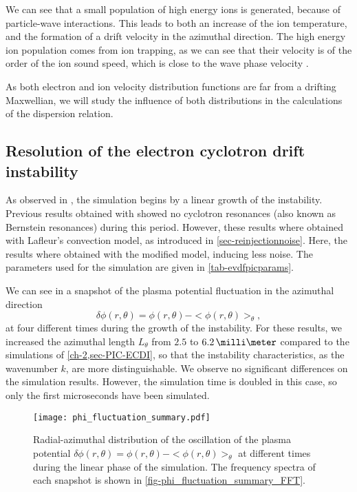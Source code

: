   We can see that a small population of high energy ions is generated, because of particle-wave interactions.
  This leads to both an increase of the ion temperature, and the formation of a drift velocity in the azimuthal direction.
  The high energy ion population comes from ion trapping, as we can see that their velocity is of the order of the ion sound speed, which is close to the wave phase velocity \citep{lafleur2018}.
  
  As both electron and ion velocity distribution functions are far from a drifting Maxwellian, we will study the influence of both distributions in the calculations of the dispersion relation.
  
  
  \subsection{Resolution of the electron cyclotron drift instability} \label{subsec-ECDIPIC}
  
  
    As observed in , the simulation begins by a linear growth of the instability.
    Previous results obtained with \LPPic \citep{croes2017a} showed no cyclotron resonances (also known as Bernstein resonances) during this period.
    However, these results where obtained with Lafleur's convection model, as introduced in \cref{sec-reinjectionnoise}.
    Here, the results where obtained with the modified model, inducing less noise.
    The parameters used for the simulation are given in \cref{tab-evdfpicparams}.
    
    We can see in   a snapshot of the plasma potential fluctuation in the azimuthal direction \[ \delta \phi(r, \theta) = \phi(r, \theta) - < \phi(r, \theta) >_{ \theta}, \]
    at four different times during the growth of the instability.
    For these results, we increased the azimuthal length $L_{\theta}$ from $2.5$ to $6.2\,\milli\meter$ compared to the simulations of \cref{ch-2,sec-PIC-ECDI}, so that the instability characteristics, as the wavenumber $k$, are more distinguishable.
    We observe no significant differences on the simulation results.
    However, the simulation time is doubled in this case, so only the first microseconds have been simulated.
    

    
    \begin{figure}[!hbt]
      \centering
      \texttt{[image: phi\_fluctuation\_summary.pdf]}
      \caption{Radial-azimuthal distribution of the oscillation of the plasma potential $\delta \phi(r, \theta) = \phi(r, \theta) - < \phi(r, \theta) >_{ \theta}$ at different times during the linear phase of the simulation. The frequency spectra of each snapshot is shown in \cref{fig-phi_fluctuation_summary_FFT}. }
      \label{fig-phi_fluctuation_summary}
    \end{figure}
    
